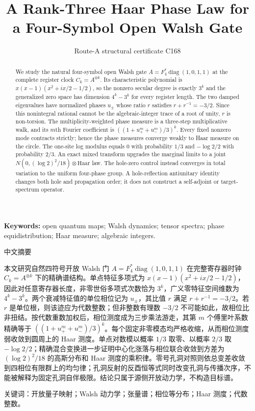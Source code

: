 \documentclass[10pt]{article}
\title{\vspace{-1.8em}A Rank-Three Haar Phase Law for a Four-Symbol Open Walsh Gate}
\author{Route-A structural certificate C168}
\date{}
\begin{document}
\maketitle
\begin{abstract}
We study the natural four-symbol open Walsh gate
$A=F_4^*\operatorname{diag}(1,0,1,1)$ at the complete register clock
$C_k=A^{\otimes k}$.  Its characteristic polynomial is
$x(x-1)(x^2+ix/2-1/2)$, so the nonzero secular degree is exactly $3^k$ and
the generalized zero space has dimension $4^k-3^k$ for every register
length.  The two damped eigenvalues have normalized phases $u_\pm$ whose
ratio $r$ satisfies $r+r^{-1}=-3/2$.  Since this nonintegral rational cannot
be the algebraic-integer trace of a root of unity, $r$ is non-torsion.  The
multiplicity-weighted phase measure is a three-step multiplicative walk, and
its $m$th Fourier coefficient is
$((1+u_+^m+u_-^m)/3)^k$.  Every fixed nonzero mode contracts strictly;
hence the phase measures converge weakly to Haar measure on the circle.
The one-site log modulus equals $0$ with probability $1/3$ and
$-\log2/2$ with probability $2/3$.  An exact mixed transform upgrades the
marginal limits to a joint
$N(0,(\log2)^2/18)\otimes\mathrm{Haar}$ law.  The hole-zero control instead
converges in total variation to the uniform
four-phase group.  A hole-reflection antiunitary identity changes both hole
and propagation order; it does not construct a self-adjoint or target-spectrum
operator.
\end{abstract}
\noindent\textbf{Keywords:} open quantum maps; Walsh dynamics; tensor
spectra; phase equidistribution; Haar measure; algebraic integers.

\begin{otherlanguage}{chinese-simplified}
\begin{center}{\large 中文摘要}\end{center}
\begin{sloppypar}
本文研究自然四符号开放 \foreignlanguage{english}{Walsh} 门
$A=F_4^*\operatorname{diag}(1,0,1,1)$ 在完整寄存器时钟
$C_k=A^{\otimes k}$ 下的精确谱结构。单点特征多项式为
$x(x-1)(x^2+ix/2-1/2)$，因此对任意寄存器长度，非零世俗多项式次数恰为
$3^k$，广义零特征空间维数为 $4^k-3^k$。两个衰减特征值的单位相位记为
$u_\pm$，其比值 $r$ 满足 $r+r^{-1}=-3/2$。若 $r$ 是单位根，则该迹应为代数整数；但非整数有理数 $-3/2$ 不可能如此，故相位比非扭结。按代数重数加权后，相位测度成为三步乘法游走，其第 $m$ 个傅里叶系数精确等于
$((1+u_+^m+u_-^m)/3)^k$。每个固定非零模态均严格收缩，从而相位测度弱收敛到圆周上的 \foreignlanguage{english}{Haar} 测度。单点对数模以概率 $1/3$ 取零、以概率 $2/3$ 取 $-\log2/2$；精确混合变换进一步证明中心化涨落与相位联合收敛到方差为 $(\log2)^2/18$ 的高斯分布和 \foreignlanguage{english}{Haar} 测度的乘积律。零号孔洞对照则依总变差收敛到四相位有限群上的均匀律；孔洞反射的反酉恒等式同时改变孔洞与传播次序，不能被解释为固定孔洞自伴极限。结论只属于源侧开放动力学，不构造目标谱。
\end{sloppypar}
\noindent 关键词：开放量子映射；\foreignlanguage{english}{Walsh} 动力学；张量谱；相位等分布；\foreignlanguage{english}{Haar} 测度；代数整数。
\end{otherlanguage}
\end{document}
